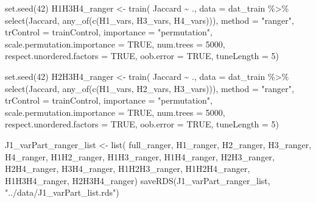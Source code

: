 \documentclass[
  letterpaper,
  DIV=11,
  numbers=noendperiod]{scrreprt}
\newenvironment{Shaded}{\begin{snugshade}}{\end{snugshade}}
\newcommand{\AttributeTok}[1]{\textcolor[rgb]{0.40,0.45,0.13}{#1}}
\newcommand{\ConstantTok}[1]{\textcolor[rgb]{0.56,0.35,0.01}{#1}}
\newcommand{\DecValTok}[1]{\textcolor[rgb]{0.68,0.00,0.00}{#1}}
\newcommand{\FunctionTok}[1]{\textcolor[rgb]{0.28,0.35,0.67}{#1}}
\newcommand{\NormalTok}[1]{\textcolor[rgb]{0.00,0.23,0.31}{#1}}
\newcommand{\OtherTok}[1]{\textcolor[rgb]{0.00,0.23,0.31}{#1}}
\newcommand{\SpecialCharTok}[1]{\textcolor[rgb]{0.37,0.37,0.37}{#1}}
\newcommand{\StringTok}[1]{\textcolor[rgb]{0.13,0.47,0.30}{#1}}
\begin{document}
\begin{Shaded}
\begin{Highlighting}[]
\FunctionTok{set.seed}\NormalTok{(}\DecValTok{42}\NormalTok{)}
\NormalTok{H1H3H4\_ranger }\OtherTok{\textless{}{-}} \FunctionTok{train}\NormalTok{(}
\NormalTok{    Jaccard }\SpecialCharTok{\textasciitilde{}}\NormalTok{ .,}
    \AttributeTok{data =}\NormalTok{ dat\_train }\SpecialCharTok{\%\textgreater{}\%} \FunctionTok{select}\NormalTok{(Jaccard, }\FunctionTok{any\_of}\NormalTok{(}\FunctionTok{c}\NormalTok{(H1\_vars, H3\_vars, H4\_vars))),}
    \AttributeTok{method =} \StringTok{"ranger"}\NormalTok{,}
    \AttributeTok{trControl =}\NormalTok{ trainControl,}
    \AttributeTok{importance =} \StringTok{"permutation"}\NormalTok{,}
    \AttributeTok{scale.permutation.importance =} \ConstantTok{TRUE}\NormalTok{,}
    \AttributeTok{num.trees =} \DecValTok{5000}\NormalTok{,}
    \AttributeTok{respect.unordered.factors =} \ConstantTok{TRUE}\NormalTok{,}
    \AttributeTok{oob.error =} \ConstantTok{TRUE}\NormalTok{,}
    \AttributeTok{tuneLength =} \DecValTok{5}\NormalTok{)}

\FunctionTok{set.seed}\NormalTok{(}\DecValTok{42}\NormalTok{)}
\NormalTok{H2H3H4\_ranger }\OtherTok{\textless{}{-}} \FunctionTok{train}\NormalTok{(}
\NormalTok{    Jaccard }\SpecialCharTok{\textasciitilde{}}\NormalTok{ .,}
    \AttributeTok{data =}\NormalTok{ dat\_train }\SpecialCharTok{\%\textgreater{}\%} \FunctionTok{select}\NormalTok{(Jaccard, }\FunctionTok{any\_of}\NormalTok{(}\FunctionTok{c}\NormalTok{(H1\_vars, H2\_vars, H3\_vars))),}
    \AttributeTok{method =} \StringTok{"ranger"}\NormalTok{,}
    \AttributeTok{trControl =}\NormalTok{ trainControl,}
    \AttributeTok{importance =} \StringTok{"permutation"}\NormalTok{,}
    \AttributeTok{scale.permutation.importance =} \ConstantTok{TRUE}\NormalTok{,}
    \AttributeTok{num.trees =} \DecValTok{5000}\NormalTok{,}
    \AttributeTok{respect.unordered.factors =} \ConstantTok{TRUE}\NormalTok{,}
    \AttributeTok{oob.error =} \ConstantTok{TRUE}\NormalTok{,}
    \AttributeTok{tuneLength =} \DecValTok{5}\NormalTok{)}

\NormalTok{J1\_varPart\_ranger\_list }\OtherTok{\textless{}{-}} \FunctionTok{list}\NormalTok{(}
\NormalTok{    full\_ranger, H1\_ranger, H2\_ranger, H3\_ranger, H4\_ranger, }
\NormalTok{    H1H2\_ranger, H1H3\_ranger, H1H4\_ranger, }
\NormalTok{    H2H3\_ranger, H2H4\_ranger, }
\NormalTok{    H3H4\_ranger, }
\NormalTok{    H1H2H3\_ranger, H1H2H4\_ranger, H1H3H4\_ranger, }
\NormalTok{    H2H3H4\_ranger)}
\FunctionTok{saveRDS}\NormalTok{(J1\_varPart\_ranger\_list, }\StringTok{"../data/J1\_varPart\_list.rds"}\NormalTok{)}
\end{Highlighting}
\end{Shaded}
\end{document}
